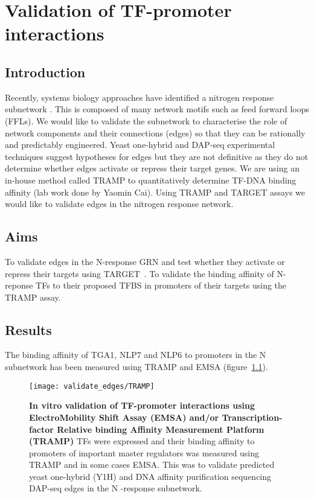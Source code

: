 \documentclass[../main.tex]{subfiles}
\begin{document}
\chapter{Validation of TF-promoter interactions}\label{chapter4}
\section{Introduction}\label{chapter4:introduction}
Recently, systems biology approaches have identified a nitrogen response subnetwork \autocite{gaudinierTranscriptionalRegulationNitrogenassociated2018}.
This is composed of many network motifs such as feed forward loops (FFLs).
We would like to validate the subnetwork to characterise the role of network components and their connections (edges) so that they can be rationally and predictably engineered.
Yeast one-hybrid and DAP-seq experimental techniques suggest hypotheses for edges but they are not definitive as they do not determine whether edges activate or repress their target genes.
We are using an in-house method called TRAMP to quantitatively determine TF-DNA binding affinity (lab work done by Yaomin Cai).
Using TRAMP and TARGET assays we would like to validate edges in the nitrogen response network.
\section{Aims}\label{chapter4:aims}
To validate edges in the N-response GRN and test whether they activate or repress their targets using TARGET~\autocite{bargmannTARGETTransientTransformation2013}.
To validate the binding affinity of N-reponse TFs to their proposed TFBS in promoters of their targets using the TRAMP assay.
\section{Results}\label{chapter4:results}
The binding affinity of TGA1, NLP7 and NLP6 to promoters in the N subnetwork has been measured using TRAMP and EMSA (figure~\ref{fig:tramp}).
\begin{figure}[hbt!]
	\begin{center}
		\capstart
		\texttt{[image: validate\_edges/TRAMP]}
		\caption{
			\textbf{In vitro validation of TF-promoter interactions using ElectroMobility Shift Assay (EMSA) and/or Transcription-factor Relative binding Affinity Measurement Platform (TRAMP)}
			TFs were expressed and their binding affinity to promoters of important master regulators was measured using TRAMP and in some cases EMSA.
            This was to validate predicted yeast one\hyp{}hybrid (Y1H) \autocite{gaudinierTranscriptionalRegulationNitrogenassociated2018} and DNA affinity purification sequencing {DAP-seq} \autocite{omalleyCistromeEpicistromeFeatures2016} edges in the N \hyp{}response subnetwork.
			\label{fig:tramp}
		}
	\end{center}
\end{figure}
\end{document}
